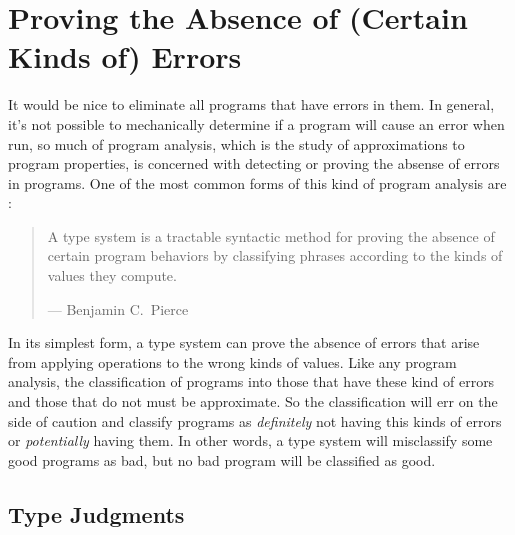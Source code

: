 \newcommand\typevaljudge[3]{{#1}\vdash{#2}:{#3}}
\newcommand\mtype{t}
\newcommand\typeof{\mathit{typeof}}
\newcommand\treduce{\mathbf{t}}
\newcommand\mtans{ta}
\newcommand\Ans{\mathit{Ans}}
\newcommand\TyAns{\mathit{TyAns}}

\newcommand\meint{i^\dagger}
\newcommand\moeint{j^\dagger}
\newcommand\mintv{\vec\mint}
\newcommand\mointv{\vec\moint}

\newcommand\BI{\mathcal{BI}}
\newcommand\ireduce{\mathbf{i}}
\newcommand\intvdiv{\mathop\backslash}

\newcommand\mpath{\phi}
\newcommand\mcon{c}
\newcommand\msval{sv}



\section{Proving the Absence of (Certain Kinds of) Errors}

It would be nice to eliminate all programs that have errors in them.
In general, it's not possible to mechanically determine if a program
will cause an error when run, so much of program analysis, which is
the study of approximations to program properties, is concerned with
detecting or proving the absense of errors in programs.  One of the
most common forms of this kind of program analysis are :

\begin{quotation}
A type system is a tractable syntactic method for proving the absence
of certain program behaviors by classifying phrases according to the
kinds of values they compute.

\raggedleft --- Benjamin C.~Pierce
\end{quotation}

In its simplest form, a type system can prove the absence of errors
that arise from applying operations to the wrong kinds of values.  Like
any program analysis, the classification of programs into those that
have these kind of errors and those that do not must be approximate.
So the classification will err on the side of caution and classify
programs as \emph{definitely} not having this kinds of errors or
\emph{potentially} having them.  In other words, a type system will
misclassify some good programs as bad, but no bad program will be
classified as good.


\subsection{Type Judgments}\label{sec:type-judgments}


